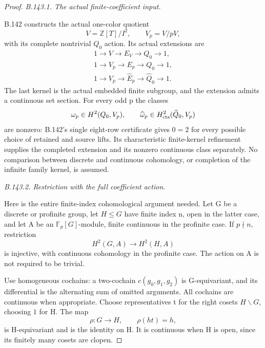 \begin{proof}
\emph{B.143.1. The actual finite-coefficient input.}\par
B.142 constructs the actual one-color quotient
\[
 V=\mathbb Z[T]/I^2,\qquad V_p=V/pV,
\]
with its complete nontrivial \(Q_0\) action. Its actual extensions are
\begin{equation}\label{eq:B143-actual-extensions}
 \begin{gathered}
 1\longrightarrow V\longrightarrow E_V\longrightarrow Q_0
       \longrightarrow1,\\
 1\longrightarrow V_p\longrightarrow E_p\longrightarrow Q_0
       \longrightarrow1,\\
 1\longrightarrow V_p\longrightarrow\widehat E_p
       \longrightarrow\widehat Q_0\longrightarrow1.
 \end{gathered}
\end{equation}
The last kernel is the actual embedded finite subgroup,
and the extension admits a continuous set section.
For every odd p the classes
\[
 \omega_p\in H^2(Q_0,V_p),\qquad
 \widehat\omega_p\in H^2_{\rm cts}(\widehat Q_0,V_p)
\]
are nonzero: B.142's single eight-row certificate gives
\(0=2\) for every possible choice of retained and source lifts.
Its characteristic finite-kernel refinement supplies the
completed extension and its nonzero continuous class separately.
No comparison between discrete and continuous cohomology,
or completion of the infinite family kernel, is assumed.

\emph{B.143.2. Restriction with the full coefficient action.}\par
Here is the entire finite-index cohomological argument needed.
Let G be a discrete or profinite group, let \(H\leq G\)
have finite index n, open in the latter case, and let A be
an \(\mathbb F_p[G]\)-module, finite continuous in the
profinite case. If \(p\nmid n\), restriction
\[
                       H^2(G,A)\longrightarrow H^2(H,A)
 \tag{B.143.1}
\]
is injective, with continuous cohomology in the profinite case.
The action on A is not required to be trivial.

Use homogeneous cochains: a two-cochain \(c(g_0,g_1,g_2)\)
is G-equivariant, and its differential is the alternating
sum of omitted arguments. All cochains are continuous when
appropriate. Choose representatives t for the right cosets
\(H\backslash G\), choosing \(1\) for H. The map
\[
                 \rho:G\to H,\qquad \rho(ht)=h,
\]
is H-equivariant and is the identity on H. It is continuous
when H is open, since its finitely many cosets are clopen.


\end{proof}
